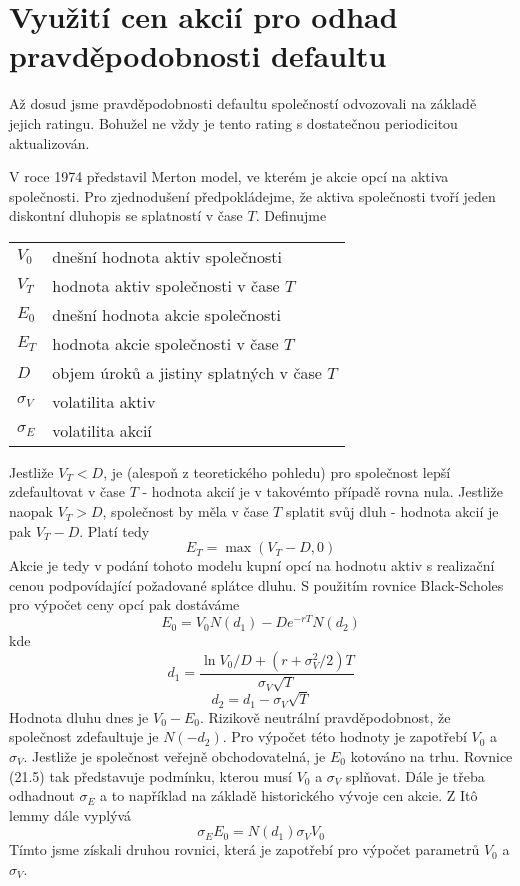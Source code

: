 \documentclass[a4paper]{book}
\begin{document}
\section{Využití cen akcií pro odhad pravděpodobnosti defaultu}

Až dosud jsme pravděpodobnosti defaultu společností odvozovali na základě jejich ratingu. Bohužel ne vždy je tento rating s dostatečnou periodicitou aktualizován.

V roce 1974 představil Merton model, ve kterém je akcie opcí na aktiva společnosti. Pro zjednodušení předpokládejme, že aktiva společnosti tvoří jeden diskontní dluhopis se splatností v čase $T$. Definujme
\begin{center}
\begin{tabular}{l l}
$V_0$          & dnešní hodnota aktiv společnosti\\
$V_T$          & hodnota aktiv společnosti v čase $T$\\
$E_0$          & dnešní hodnota akcie společnosti\\
$E_T$          & hodnota akcie společnosti v čase $T$\\
$D$            & objem úroků a jistiny splatných v čase $T$\\
$\sigma_V$     & volatilita aktiv\\
$\sigma_E$     & volatilita akcií\\
\end{tabular}
\end{center}
Jestliže $V_T < D$, je (alespoň z teoretického pohledu) pro společnost lepší zdefaultovat v čase $T$ - hodnota akcií je v takovémto případě rovna nula. Jestliže naopak $V_T > D$, společnost by měla v čase $T$ splatit svůj dluh - hodnota akcií je pak $V_T - D$. Platí tedy
\begin{equation*}
E_T = \max(V_T - D, 0)
\end{equation*}
Akcie je tedy v podání tohoto modelu kupní opcí na hodnotu aktiv s realizační cenou podpovídající požadované splátce dluhu. S použitím rovnice Black-Scholes pro výpočet ceny opcí pak dostáváme
\begin{equation}
E_0 = V_0N(d_1) - De^{-rT}N(d_2)
\end{equation}
kde
\begin{equation*}
d_1 = \frac{\ln V_0/D + (r+\sigma^2_V/2)T}{\sigma_V \sqrt{T}}
\end{equation*}
\begin{equation*}
d_2 = d_1 - \sigma_V \sqrt{T}
\end{equation*}
Hodnota dluhu dnes je $V_0 - E_0$. Rizikově neutrální pravděpodobnost, že společnost zdefaultuje je $N(-d_2)$. Pro výpočet této hodnoty je zapotřebí $V_0$ a $\sigma_V$. Jestliže je společnost veřejně obchodovatelná, je $E_0$ kotováno na trhu. Rovnice (21.5) tak představuje podmínku, kterou musí $V_0$ a $\sigma_V$ splňovat. Dále je třeba odhadnout $\sigma_E$ a to například na základě historického vývoje cen akcie. Z It\^o lemmy dále vyplývá
\begin{equation*}
\sigma_E E_0 = N(d_1)\sigma_V V_0
\end{equation*}
Tímto jsme získali druhou rovnici, která je zapotřebí pro výpočet parametrů $V_0$ a $\sigma_V$.
\end{document}
